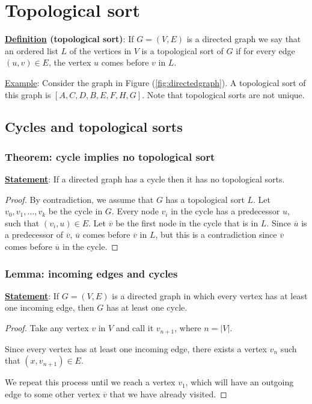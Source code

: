 \documentclass[12pt]{extarticle}
\begin{document}
\section{Topological sort}

\textbf{\underline{Definition} (topological sort)}: If $G = (V, E)$ is a directed graph we say that an ordered list $L$ of the vertices in $V$ is a topological sort of $G$ if for every edge $(u, v) \in E$, the vertex $u$ comes before $v$ in $L$.

\underline{Example}: Consider the graph in Figure (\ref{fig:directedgraph}). A topological sort of this graph is $[A, C, D, B, E, F, H, G]$.
Note that topological sorts are not unique.


\subsection{Cycles and topological sorts}

\subsubsection{Theorem: cycle implies no topological sort}

\textbf{\underline{Statement}}: If a directed graph has a cycle then it has no topological sorts.

\begin{proof}
    By contradiction, we assume that $G$ has a topological sort $L$.
    Let $v_0, v_1, \dots, v_k$ be the cycle in $G$.
    Every node $v_i$ in the cycle has a predecessor $u$, such that $(v_i, u) \in E$.
    Let $\overline{v}$ be the first node in the cycle that is in $L$.
    Since $\overline {u}$ is a predecessor of $\overline{v}$, $\overline{u}$ comes before $\overline{v}$ in $L$,
    but this is a contradiction since $\overline{v}$ comes before $\overline{u}$ in the cycle.
\end{proof}

\subsubsection{Lemma: incoming edges and cycles}

\textbf{\underline{Statement}}: If $G = (V, E)$ is a directed graph in which every vertex has at least one incoming edge, then $G$ has at least one cycle.

\begin{proof}
    Take any vertex $v$ in $V$ and call it $v_{n+1}$, where $n = |V|$.

    Since every vertex has at least one incoming edge, there exists a vertex $v_n$ such that $(x, v_{n+1}) \in E$.

    We repeat this process until we reach a vertex $v_1$, which will have an outgoing edge to some other vertex $\overline{v}$ that we have already visited.
\end{proof}
\end{document}

